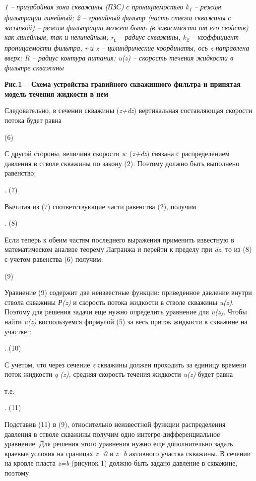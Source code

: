 \begin{multicols}{2}
\emph{1 -- призабойная зона скважины (ПЗС) с проницаемостью
k\textsubscript{1} -- режим фильтрации линейный; 2 -- гравийный фильтр
(часть ствола скважины с засыпкой) -- режим фильтрации может быть (в
зависимости от его свойств) как линейным, так и нелинейным;
r\textsubscript{с} -- радиус скважины, k\textsubscript{2} -- коэффициент
проницаемости фильтра, r и z -- цилиндрические координаты, ось z
направлена вверх; R -- радиус контура питания; u(z) -- скорость течения
жидкости в фильтре скважины}

{\bfseries Рис.1 -- Схема устройства гравийного скважинного фильтра и
принятая модель течения жидкости в нем}

Следовательно, в сечении скважины (\emph{z+dz}) вертикальная
составляющая скорости потока будет равна

(6)

С другой стороны, величина скорости \emph{u∙} (\emph{z+dz}) связана с
распределением давления в стволе скважины по закону (2). Поэтому должно
быть выполнено равенство:

.
(7)

Вычитая из (7) соответствующие части равенства (2), получим

.
(8)

Если теперь к обеим частям последнего выражения применить известную в
математическом анализе теорему Лагранжа и перейти к пределу при
\emph{dz},
то из (8) с учетом равенства (6) получим:

(9)

Уравнение (9) содержит две неизвестные функции: приведенное давление
внутри ствола скважины \emph{Р(z)} и скорость потока жидкости в стволе
скважины \emph{u(z)}. Поэтому для решения задачи еще нужно определить
уравнение для \emph{u(z)}. Чтобы найти \emph{u(z)} воспользуемся
формулой (5) за весь приток жидкости к скважине на участке
:

.
(10)

С учетом, что через сечение \emph{z} скважины должен проходить за
единицу времени поток жидкости \emph{q (z),} средняя скорость течения
жидкости \emph{u(z)} будет равна

т.е.

.
(11)

Подставив (11) в (9), относительно неизвестной функции распределения
давления
в
стволе скважины получим одно интегро-дифференциальное уравнение. Для
решения этого уравнения нужно еще дополнительно задать краевые условия
на границах \emph{z=0} и \emph{z=b} активного участка скважины. В
сечении на кровле пласта \emph{z=b} (рисунок 1) должно быть задано
давление в скважине, поэтому


\end{multicols}
